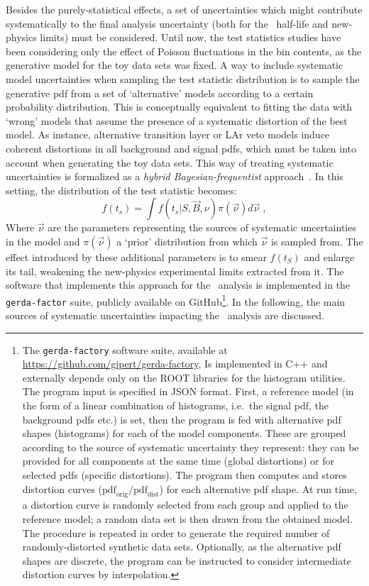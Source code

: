 Besides the purely-statistical effects, a set of uncertainties which might contribute
systematically to the final analysis uncertainty (both for the \nnbb\ half-life and
new-physics limits) must be considered. Until now, the test statistics studies have been
considering only the effect of Poisson fluctuations in the bin contents, as the generative
model for the toy data sets was fixed. A way to include systematic model uncertainties
when sampling the test statistic distribution is to sample the generative pdf from a set
of `alternative' models according to a certain probability distribution. This is
conceptually equivalent to fitting the data with `wrong' models that assume the presence
of a systematic distortion of the best model. As instance, alternative transition layer
or LAr veto models induce coherent distortions in all background and signal pdfs, which
must be taken into account when generating the toy data sets.
\newpar
This way of treating systematic uncertainties is formalized as a \emph{hybrid
Bayesian-frequentist} approach~\cite{Tanabashi2018}. In this setting, the distribution
of the test statistic becomes:
\[
  f(t_s) = \int f(t_s | S, \vec{B}, \nu) \pi(\vec{\nu}) d\vec{\nu} \;,
\]
Where $\vec{\nu}$ are the parameters representing the sources of systematic uncertainties
in the model and $\pi(\vec{\nu})$ a `prior' distribution from which $\vec{\nu}$ is sampled
from. The effect introduced by these additional parameters is to smear $f(t_S)$ and
enlarge its tail, weakening the new-physics experimental limits extracted from it. The
software that implements this approach for the \nnbb\ analysis is implemented in the
\texttt{gerda-factor} suite, publicly available on GitHub\footnote{%
  The \texttt{gerda-factory} software suite, available at
  \url{https://github.com/gipert/gerda-factory}, Is implemented in C++ and externally
  depends only on the ROOT libraries for the histogram utilities. The program input is
  specified in JSON format. First, a reference model (in the form of a linear combination
  of histograms, i.e.~the signal pdf, the background pdfs etc.) is set, then the program
  is fed with alternative pdf shapes (histograms) for each of the model components. These
  are grouped according to the source of systematic uncertainty they represent: they can
  be provided for all components at the same time (global distortions) or for selected
  pdfs (specific distortions). The program then computes and stores distortion curves
  ($\text{pdf}_\text{orig}/\text{pdf}_\text{dist}$) for each alternative pdf shape. At run
  time, a distortion curve is randomly selected from each group and applied to the
  reference model; a random data set is then drawn from the obtained model. The procedure
  is repeated in order to generate the required number of randomly-distorted synthetic
  data sets. Optionally, as the alternative pdf shapes are discrete, the program can be
  instructed to consider intermediate distortion curves by interpolation.
}. In the following, the main sources of systematic uncertainties impacting the \nnbb\
analysis are discussed.

